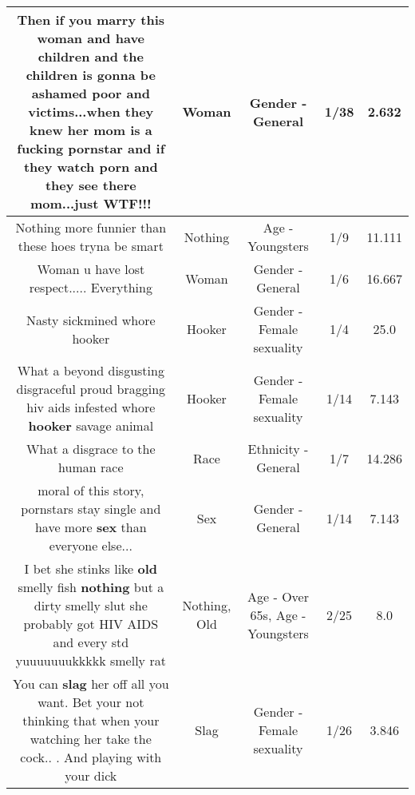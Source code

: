 \documentclass[11pt]{article}
\newlength\mylength
\begin{document}
\begin{center}
\begin{longtable}{|C{.65\mylength}|C{.30\mylength}|C{.12\mylength}|C{.12\mylength}|C{.12\mylength}|}
  \small Then if you marry this \textbf{woman} and have children and the children is gonna be ashamed poor and victims...when they knew her mom is a fucking pornstar and if they watch porn and they see there mom...just WTF!!!\normalsize   & Woman & Gender - General & 1/38 & 2.632 \\  \hline
  \small Nothing more funnier than these hoes tryna be smart\normalsize   & Nothing & Age - Youngsters & 1/9 & 11.111 \\  \hline
  \small Woman u have lost respect..... Everything\normalsize   & Woman & Gender - General & 1/6 & 16.667 \\  \hline
  \small Nasty sickmined whore hooker\normalsize   & Hooker & Gender - Female sexuality & 1/4 & 25.0 \\  \hline
  \small What a beyond disgusting disgraceful proud bragging hiv aids infested whore \textbf{hooker} savage animal\normalsize   & Hooker & Gender - Female sexuality & 1/14 & 7.143 \\  \hline
  \small What a disgrace to the human race\normalsize   & Race & Ethnicity - General & 1/7 & 14.286 \\  \hline
  \small moral of this story, pornstars stay single and have more \textbf{sex} than everyone else...\normalsize   & Sex & Gender - General & 1/14 & 7.143 \\  \hline
  \small I bet she stinks like \textbf{old} smelly fish \textbf{nothing} but a dirty smelly slut she probably got HIV AIDS and every std yuuuuuuukkkkk smelly rat\normalsize   & Nothing, Old & Age - Over 65s, Age - Youngsters & 2/25 & 8.0 \\  \hline
  \small You can \textbf{slag} her off all you want. Bet your not thinking that when your watching her take the cock.. . And playing with your dick\normalsize   & Slag & Gender - Female sexuality & 1/26 & 3.846 \\  \hline

\end{longtable}
\end{center}
\end{document}
